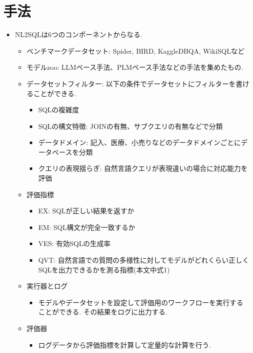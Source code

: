 \documentclass[dvipdfmx,uplatex]{jsarticle}
\theoremstyle{remark}
\newenvironment{method}[1]{
    \begin{tcolorbox}[
        colframe=green!50!black,
        colback=green!50!black!10!white,
        colbacktitle=green!50!black!40!white,
        coltitle=black,
        fonttitle=\bfseries,
        title={#1}
    ]
}{
    \end{tcolorbox}
}
\begin{document}
\section{手法}
\begin{method}{NL2SQL360}
\begin{itemize}
    \item NL2SQLは6つのコンポーネントからなる.
    \begin{itemize}
        \item ベンチマークデータセット: Spider, BIRD, KaggleDBQA, WikiSQLなど
        \item モデルzoo: LLMベース手法、PLMベース手法などの手法を集めたもの.
        \item データセットフィルター: 以下の条件でデータセットにフィルターを書けることができる.
        \begin{itemize}
            \item SQLの複雑度
            \item SQLの構文特徴: JOINの有無、サブクエリの有無などで分類
            \item データドメイン: 記入、医療、小売りなどのデータドメインごとにデータベースを分類
            \item クエリの表現揺らぎ: 自然言語クエリが表現違いの場合に対応能力を評価
        \end{itemize}
        \item 評価指標
        \begin{itemize}
            \item EX: SQLが正しい結果を返すか
            \item EM: SQL構文が完全一致するか
            \item VES: 有効SQLの生成率
            \item QVT: 自然言語での質問の多様性に対してモデルがどれくらい正しくSQLを出力できるかを測る指標(本文中式1)
        \end{itemize}
        \item 実行器とログ
        \begin{itemize}
            \item モデルやデータセットを設定して評価用のワークフローを実行することができる. その結果をログに出力する.
        \end{itemize}
        \item 評価器
        \begin{itemize}
            \item ログデータから評価指標を計算して定量的な計算を行う. 
        \end{itemize}
    \end{itemize}
\end{itemize}
\end{method}
\end{document}
